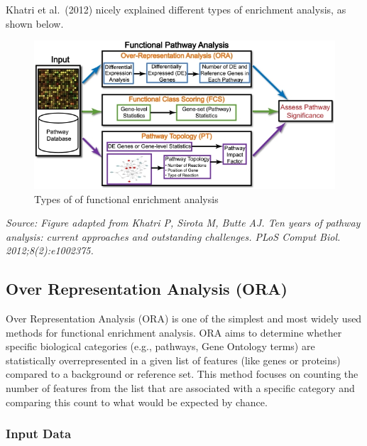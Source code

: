\documentclass[
]{book}
\begin{document}
Khatri et al.~(2012) nicely explained different types of enrichment analysis, as shown below.

\begin{figure}

{\centering \includegraphics[width=1\linewidth]{images/fea_types} 

}

\caption{Types of  of functional enrichment analysis}\label{fig:unnamed-chunk-6}
\end{figure}

\emph{Source: Figure adapted from Khatri P, Sirota M, Butte AJ. Ten years of pathway analysis: current approaches and outstanding challenges. PLoS Comput Biol. 2012;8(2):e1002375.}

\hypertarget{over-representation-analysis-ora}{%
\subsection{Over Representation Analysis (ORA)}\label{over-representation-analysis-ora}}

Over Representation Analysis (ORA) is one of the simplest and most widely used methods for functional enrichment analysis. ORA aims to determine whether specific biological categories (e.g., pathways, Gene Ontology terms) are statistically overrepresented in a given list of features (like genes or proteins) compared to a background or reference set. This method focuses on counting the number of features from the list that are associated with a specific category and comparing this count to what would be expected by chance.

\hypertarget{input-data}{%
\subsubsection{Input Data}\label{input-data}}
\end{document}
